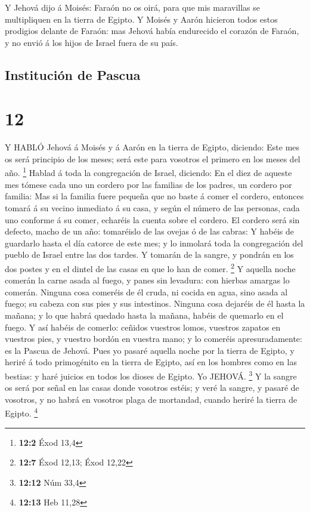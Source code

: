  Y Jehová dijo á Moisés: Faraón no os oirá, para que mis
maravillas se multipliquen en la tierra de Egipto.  Y
Moisés y Aarón hicieron todos estos prodigios delante de Faraón: mas
Jehová había endurecido el corazón de Faraón, y no envió á los hijos de
Israel fuera de su país.

\hypertarget{instituciuxf3n-de-pascua}{%
\subsection{Institución de Pascua}\label{instituciuxf3n-de-pascua}}

\hypertarget{section-11}{%
\section{12}\label{section-11}}

 Y HABLÓ Jehová á Moisés y á Aarón en la tierra de Egipto,
diciendo:  Este mes os será principio de los meses; será
este para vosotros el primero en los meses del año. \footnote{\textbf{12:2}
  Éxod 13,4}  Hablad á toda la congregación de Israel,
diciendo: En el diez de aqueste mes tómese cada uno un cordero por las
familias de los padres, un cordero por familia:  Mas si la
familia fuere pequeña que no baste á comer el cordero, entonces tomará á
su vecino inmediato á su casa, y según el número de las personas, cada
uno conforme á su comer, echaréis la cuenta sobre el cordero.
 El cordero será sin defecto, macho de un año: tomaréislo de
las ovejas ó de las cabras:  Y habéis de guardarlo hasta el
día catorce de este mes; y lo inmolará toda la congregación del pueblo
de Israel entre las dos tardes.  Y tomarán de la sangre, y
pondrán en los dos postes y en el dintel de las casas en que lo han de
comer. \footnote{\textbf{12:7} Éxod 12,13; Éxod 12,22}  Y
aquella noche comerán la carne asada al fuego, y panes sin levadura: con
hierbas amargas lo comerán.  Ninguna cosa comeréis de él
cruda, ni cocida en agua, sino asada al fuego; su cabeza con sus pies y
sus intestinos.  Ninguna cosa dejaréis de él hasta la
mañana; y lo que habrá quedado hasta la mañana, habéis de quemarlo en el
fuego.  Y así habéis de comerlo: ceñidos vuestros lomos,
vuestros zapatos en vuestros pies, y vuestro bordón en vuestra mano; y
lo comeréis apresuradamente: es la Pascua de Jehová.  Pues
yo pasaré aquella noche por la tierra de Egipto, y heriré á todo
primogénito en la tierra de Egipto, así en los hombres como en las
bestias: y haré juicios en todos los dioses de Egipto. Yo JEHOVÁ.
\footnote{\textbf{12:12} Núm 33,4}  Y la sangre os será por
señal en las casas donde vosotros estéis; y veré la sangre, y pasaré de
vosotros, y no habrá en vosotros plaga de mortandad, cuando heriré la
tierra de Egipto. \footnote{\textbf{12:13} Heb 11,28}

